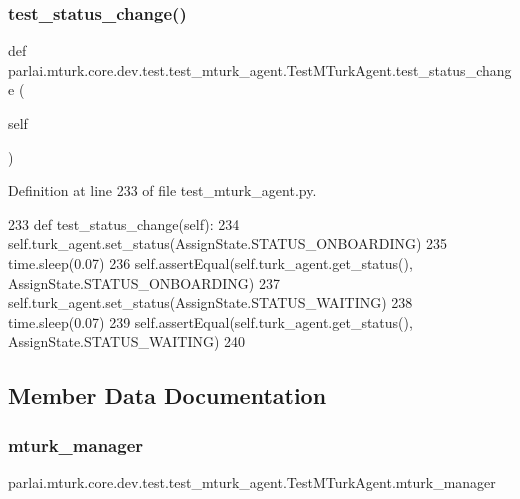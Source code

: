 \subsubsection{\texorpdfstring{test\+\_\+status\+\_\+change()}{test\_status\_change()}}
{\footnotesize\ttfamily def parlai.\+mturk.\+core.\+dev.\+test.\+test\+\_\+mturk\+\_\+agent.\+Test\+M\+Turk\+Agent.\+test\+\_\+status\+\_\+change (\begin{DoxyParamCaption}\item[{}]{self }\end{DoxyParamCaption})}



Definition at line 233 of file test\+\_\+mturk\+\_\+agent.\+py.


\begin{DoxyCode}
233     \textcolor{keyword}{def }test\_status\_change(self):
234         self.turk\_agent.set\_status(AssignState.STATUS\_ONBOARDING)
235         time.sleep(0.07)
236         self.assertEqual(self.turk\_agent.get\_status(), AssignState.STATUS\_ONBOARDING)
237         self.turk\_agent.set\_status(AssignState.STATUS\_WAITING)
238         time.sleep(0.07)
239         self.assertEqual(self.turk\_agent.get\_status(), AssignState.STATUS\_WAITING)
240 
\end{DoxyCode}


\subsection{Member Data Documentation}
\mbox{\label{classparlai_1_1mturk_1_1core_1_1dev_1_1test_1_1test__mturk__agent_1_1TestMTurkAgent_afd346baa958fb262d0e2681c3a39f298}} 
\subsubsection{\texorpdfstring{mturk\+\_\+manager}{mturk\_manager}}
{\footnotesize\ttfamily parlai.\+mturk.\+core.\+dev.\+test.\+test\+\_\+mturk\+\_\+agent.\+Test\+M\+Turk\+Agent.\+mturk\+\_\+manager}




